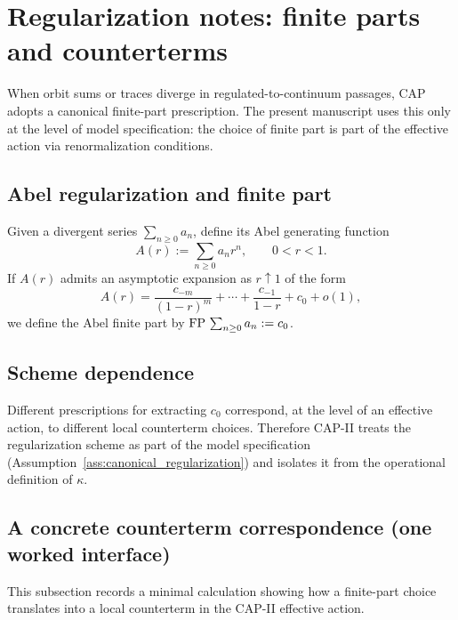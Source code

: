 \section{Regularization notes: finite parts and counterterms}
\label{app:regularization_notes}

When orbit sums or traces diverge in regulated-to-continuum passages, CAP adopts a canonical finite-part prescription.
The present manuscript uses this only at the level of model specification: the choice of finite part is part of the effective action via renormalization conditions.

\subsection{Abel regularization and finite part}
\label{app:abel_finite_part}

Given a divergent series $\sum_{n\ge 0} a_n$, define its Abel generating function
\begin{equation}
  A(r) := \sum_{n\ge 0} a_n r^n,
  \qquad 0<r<1.
\end{equation}
If $A(r)$ admits an asymptotic expansion as $r\uparrow 1$ of the form
\begin{equation}
  A(r) = \frac{c_{-m}}{(1-r)^m} + \cdots + \frac{c_{-1}}{1-r} + c_0 + o(1),
\end{equation}
we define the Abel finite part by $\mathrm{FP}\,\sum_{n\ge 0} a_n := c_0$.

\subsection{Scheme dependence}
\label{app:scheme_dependence}

Different prescriptions for extracting $c_0$ correspond, at the level of an effective action, to different local counterterm choices.
Therefore CAP-II treats the regularization scheme as part of the model specification (Assumption~\ref{ass:canonical_regularization}) and isolates it from the operational definition of $\kappa$.

\subsection{A concrete counterterm correspondence (one worked interface)}
\label{app:finite_part_counterterm_example}

This subsection records a minimal calculation showing how a finite-part choice translates into a local counterterm in the CAP-II effective action.

